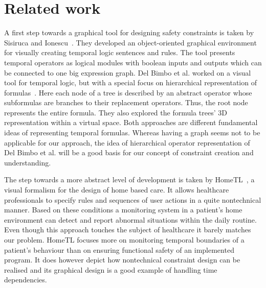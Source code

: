 





\section{Related work}
\label{sec:relatedwork}





A first step towards a graphical tool for designing safety constraints is taken by Sisiruca and Ionescu~\cite{332301}. They developed an object-oriented graphical environment for visually creating temporal logic sentences and rules. The tool presents temporal operators as logical modules with boolean inputs and outputs which can be connected to one big expression graph. Del Bimbo et al. worked on a visual tool for temporal logic, but with a special focus on hierarchical representation of formulas~\cite{520786}. Here each node of a tree is described by an abstract operator whose subformulas are branches to their replacement operators. Thus, the root node represents the entire formula. They also explored the formula trees' 3D representation within a virtual space. Both approaches are different fundamental ideas of representing temporal formulas. Whereas having a graph  seems not to be applicable for our approach, the idea of hierarchical operator representation of Del Bimbo et al. will be a good basis for our concept of constraint creation and understanding.


The step towards a more abstract level of development is taken by HomeTL~\cite{4341725}, a visual formalism for the design of home based care. It allows healthcare professionals to specify rules and sequences of user actions in a quite nontechnical manner. Based on these conditions a monitoring system in a patient's home environment can detect and report abnormal situations within the daily routine. Even though this approach touches the subject of healthcare it barely matches our problem. HomeTL focuses more on monitoring temporal boundaries of a patient's behaviour than on ensuring functional safety of an implemented program. It does however depict how nontechnical constraint design can be realised and its graphical design is a good example of handling time dependencies.

